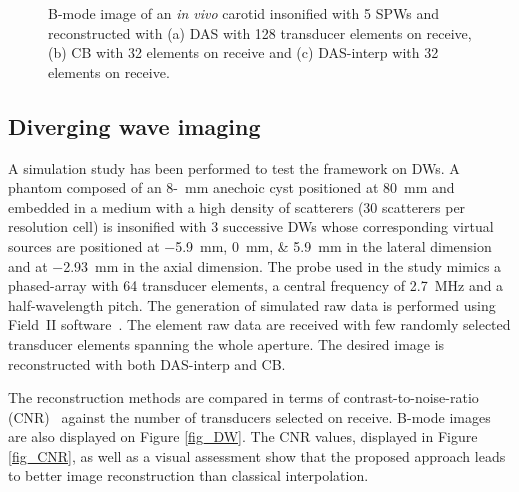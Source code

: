 \documentclass[conference]{IEEEtran}
\begin{document}
\begin{figure}[htb]
	\caption{B-mode image of an \textit{in vivo} carotid insonified with 5 SPWs and reconstructed with (a) DAS with 128 transducer elements on receive, (b) CB with 32 elements on receive and (c) DAS-interp with 32 elements on receive.}
\end{figure}
\subsection{Diverging wave imaging}
\label{subsec:PW_exp}
A simulation study has been performed to test the framework on DWs. A phantom composed of an 8-\SI{}{\milli\metre} anechoic cyst positioned at \SI{80}{\milli\metre} and embedded in a medium with a high density of scatterers (30 scatterers per resolution cell) is insonified with 3 successive DWs whose corresponding virtual sources are positioned at \SIlist{-5.9;0;5.9}{\milli\metre} in the lateral dimension and at \SI{-2.93}{\milli\metre} in the axial dimension. The probe used in the study mimics a phased-array with 64 transducer elements, a central frequency of \SI{2.7}{\mega\hertz} and a half-wavelength pitch. The generation of simulated raw data is performed using Field~II software~\cite{Jensen1996}.  The element raw data are received with few randomly selected transducer elements spanning the whole aperture. The desired image is reconstructed with both DAS-interp and CB. 
\par The reconstruction methods are compared in terms of contrast-to-noise-ratio (CNR)~\cite{Carrillo_IUS_2015} against the number of transducers selected on receive. B-mode images are also displayed on Figure \ref{fig_DW}. The CNR values, displayed in Figure \ref{fig_CNR}, as well as a visual assessment show that the proposed approach leads to better image reconstruction than classical interpolation.
\end{document}
